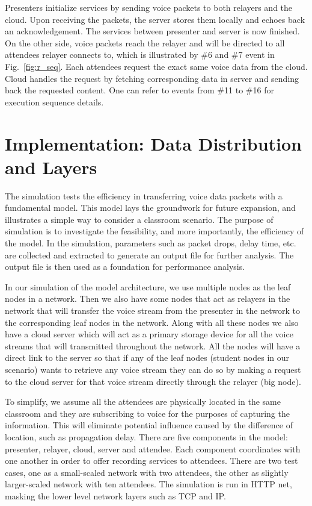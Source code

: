 Presenters initialize services by sending voice packets to both relayers and 
the cloud. Upon receiving the packets, the server stores them 
locally and echoes back an acknowledgement. The services between presenter and 
server is now finished. On the other side,
voice packets reach the relayer and will be directed to all attendees relayer 
connects to, which is illustrated by \#6 and \#7 event in Fig.~\ref{fig:r_seq}. 
Each attendees request the exact same voice data from the cloud. 
Cloud handles the request by fetching corresponding data in server and sending 
back the requested content. One can refer to events from \#11 to \#16 for 
execution sequence details. 
 

 
\section{Implementation: Data Distribution and Layers}

The simulation tests the efficiency in transferring voice data packets 
with a fundamental model. This model lays the groundwork for future expansion, 
and illustrates a simple way to consider a classroom scenario. The purpose of 
simulation is 
to investigate the feasibility, and more importantly, the efficiency of the 
model. In the simulation, parameters such as packet drops, delay time, etc. are 
collected and extracted to generate an output file for further analysis. The 
output file is then used as 
a foundation for performance analysis.  


In our simulation of the model architecture, we use multiple nodes 
as the leaf nodes in a network. 
Then we also have some nodes that act as relayers in the network that will 
transfer the voice stream from the presenter in the network to 
the corresponding leaf nodes in the network. Along with all these nodes we also 
have a cloud server which will act as a primary storage device for all the 
voice streams that will transmitted throughout the network. All the nodes will 
have a direct link to the server so that if any of the leaf nodes (student 
nodes in our scenario) wants to retrieve any voice stream they can do so by 
making a request to 
the cloud server for that voice stream directly through the relayer (big node). 

To simplify, we assume all the attendees are physically located in the same 
classroom and they are subscribing to voice for the purposes of capturing the 
information. This will eliminate potential influence caused by the difference 
of 
location, such as propagation delay. There are five components in the model: 
presenter, relayer, cloud, server and attendee. Each component coordinates with 
one another in order to offer recording services to attendees. There are two 
test cases, one as a small-scaled network with two attendees, the other as 
slightly larger-scaled network with ten attendees. The simulation 
is run in HTTP net, 
masking the lower level network layers such as TCP and IP. 


